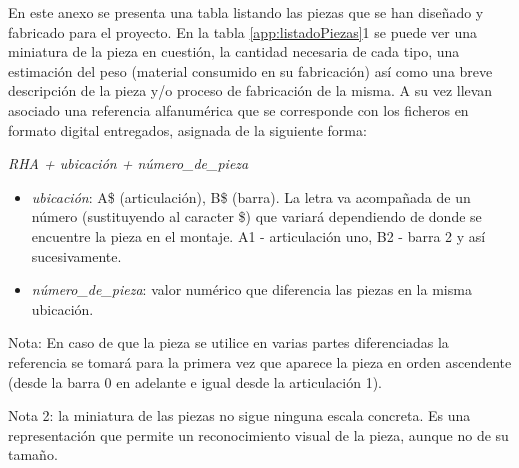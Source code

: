 \completar

En este anexo se presenta una tabla listando las piezas que se han diseñado y fabricado para el proyecto. En la tabla \ref{app:listadoPiezas}1 se puede ver una miniatura de la pieza en cuestión, la cantidad necesaria de cada tipo, una estimación del peso (material consumido en su fabricación) así como una breve descripción de la pieza y/o proceso de fabricación de la misma. A su vez llevan asociado una referencia alfanumérica que se corresponde con los ficheros en formato digital entregados, asignada de la siguiente forma:

\begin{center} 
	\textit{RHA + ubicación + número\_de\_pieza}
\end{center}

\begin{itemize}
	\item \textit{ubicación}: A\$ (articulación), B\$ (barra). La letra va acompañada de un número (sustituyendo al caracter \$) que variará dependiendo de donde se encuentre la pieza en el montaje. A1 - articulación uno, B2 - barra 2 y así sucesivamente.
	\item \textit{número\_de\_pieza}: valor numérico que diferencia las piezas en la misma ubicación.
\end{itemize}

Nota: En caso de que la pieza se utilice en varias partes diferenciadas la referencia se tomará para la primera vez que aparece la pieza en orden ascendente (desde la barra 0 en adelante e igual desde la articulación 1).

Nota 2: la miniatura de las piezas no sigue ninguna escala concreta. Es una representación que permite un reconocimiento visual de la pieza, aunque no de su tamaño.


